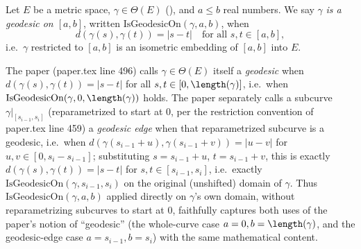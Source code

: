 \begin{definition}
  Let $E$ be a metric space, $\gamma \in \Theta(E)$ (), and $a \le b$ real numbers.
  We say $\gamma$ \emph{is a geodesic on $[a,b]$}, written $\mathrm{IsGeodesicOn}(\gamma,a,b)$, when
  \[
    d(\gamma(s), \gamma(t)) = |s - t| \quad \text{for all } s,t \in [a,b]
    ,
  \]
  i.e.\ $\gamma$ restricted to $[a,b]$ is an isometric embedding of $[a,b]$ into $E$.

  The paper (paper.tex line 496) calls $\gamma \in \Theta(E)$ itself a \emph{geodesic} when
  $d(\gamma(s),\gamma(t)) = |s-t|$ for all $s,t \in [0,\length(\gamma)]$, i.e.\ when
  $\mathrm{IsGeodesicOn}(\gamma, 0, \length(\gamma))$ holds. The paper separately calls a subcurve
  $\gamma|_{[s_{i-1},s_i]}$ (reparametrized to start at $0$, per the restriction convention of
  paper.tex line 459) a \emph{geodesic edge} when that reparametrized subcurve is a geodesic, i.e.\
  when $d(\gamma(s_{i-1}+u), \gamma(s_{i-1}+v)) = |u-v|$ for $u,v \in [0, s_i-s_{i-1}]$; substituting
  $s = s_{i-1}+u$, $t = s_{i-1}+v$, this is exactly
  $d(\gamma(s),\gamma(t)) = |s-t|$ for $s,t \in [s_{i-1},s_i]$, i.e.\ exactly
  $\mathrm{IsGeodesicOn}(\gamma, s_{i-1}, s_i)$ on the original (unshifted) domain of $\gamma$. Thus
  $\mathrm{IsGeodesicOn}(\gamma,a,b)$ applied directly on $\gamma$'s own domain, without
  reparametrizing subcurves to start at $0$, faithfully captures both uses of the paper's notion of
  ``geodesic'' (the whole-curve case $a=0,b=\length(\gamma)$, and the geodesic-edge case
  $a = s_{i-1}, b = s_i$) with the same mathematical content.
\end{definition}
